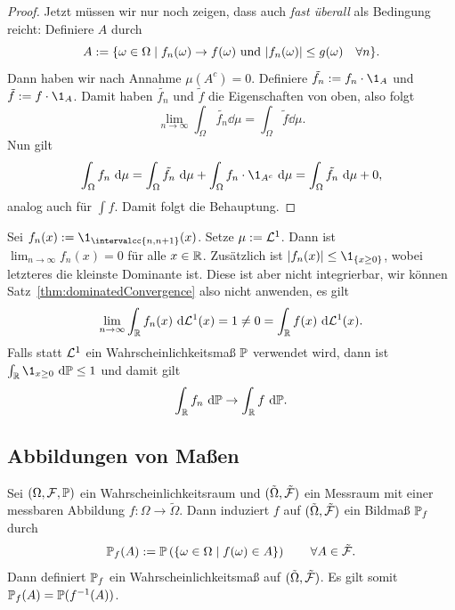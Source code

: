 \documentclass[language=ngerman]{../../Template/TemplateLecture}
\begin{document}
\begin{proof}
    Jetzt müssen wir nur noch zeigen, dass auch \emph{fast überall} als Bedingung reicht: Definiere $A$ durch 
    \begin{equation}
        A := \{\omega \in \Omega \mid f_n(\omega) \to f(\omega) \text{ und } \lvert f_n(\omega)\rvert \leq g(\omega) \quad \forall n\}.
    \end{equation}
    Dann haben wir nach Annahme $\mu(A^c) = 0$. Definiere $\tilde{f_n} := f_n \cdot \1_A$ und $\tilde{f} := f \cdot \1_A$. Damit haben $\tilde{f_n}$ und $\tilde{f}$ die Eigenschaften von oben, also folgt 
    \begin{equation}
        \lim_{n \to \infty} \int_\Omega \tilde{f_n} \dd\mu = \int_\Omega \tilde{f}\dd\mu.
    \end{equation}
    Nun gilt 
    \begin{equation}
        \int_\Omega f_n \dd\mu = \int_\Omega \tilde{f_n}\dd\mu + \int_\Omega f_n \cdot \1_{A^c} \dd\mu = \int_\Omega \tilde{f_n} \dd\mu + 0,
    \end{equation}
    analog auch für $\int f$. Damit folgt die Behauptung.
\end{proof}

\begin{beispiel}
    Sei $f_n(x) := \1_{\intervalcc{n,n+1}}(x)$. Setze $\mu := \mathcal{L}^1$. Dann ist $\lim_{n \to \infty} f_n(x) = 0$ für alle $x \in \mathbb{R}$. Zusätzlich ist $\abs{f_n(x)} \leq \1_{\set{x \geq 0}}$, wobei letzteres die kleinste Dominante ist. Diese ist aber nicht integrierbar, wir können Satz~\ref{thm:dominatedConvergence} also nicht anwenden, es gilt 
    \begin{equation}
        \lim_{n \to \infty} \int_{\mathbb{R}} f_n(x) ~\mathrm{d}\mathcal{L}^1(x) = 1 \neq 0 = \int_{\mathbb{R}} f(x) ~\mathrm{d}\mathcal{L}^1(x).
    \end{equation} 
    Falls statt $\mathcal{L}^1$ ein Wahrscheinlichkeitsmaß $\mathbb{P}$ verwendet wird, dann ist $\int_\IR \1_{x \geq 0} \dd\IP \leq 1$ und damit gilt
    \begin{equation}
        \int_{\mathbb{R}} f_n ~\mathrm{d}\mathbb{P} \to \int_{\mathbb{R}} f~\mathrm{d}\mathbb{P}.
    \end{equation}
\end{beispiel}

\subsection{Abbildungen von Maßen}

Sei $(\Omega, \mathcal{F}, \mathbb{P})$ ein Wahrscheinlichkeitsraum und $(\tilde{\Omega}, \tilde{\mathcal{F}})$ ein Messraum mit einer messbaren Abbildung $f: \Omega \to \tilde{\Omega}$. Dann induziert $f$ auf $(\tilde{\Omega}, \tilde{\mathcal{F}})$ ein Bildmaß $\mathbb{P}_f$ durch 
\begin{equation}
    \mathbb{P}_f(A) := \mathbb{P}\left( \{\omega \in \Omega \mid f(\omega) \in A\} \right) \quad \quad \forall A \in \tilde{\mathcal{F}}.
\end{equation}
Dann definiert $\mathbb{P}_f$ ein Wahrscheinlichkeitsmaß auf $(\tilde{\Omega},\tilde{\mathcal{F}})$. Es gilt somit $\mathbb{P}_f(A) = \mathbb{P}(f^{-1}(A))$.
\end{document}
